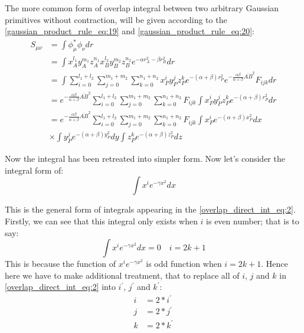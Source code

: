 The more common form of overlap integral between two arbitrary Gaussian primitives without 
contraction, will be given according to the \ref{gaussian_product_rule_eq:19} and 
\ref{gaussian_product_rule_eq:20}:
\begin{equation}
 \label{overlap_direct_int_eq:2}
\begin{split}
S_{\mu\nu}  &= \int \phi_{\mu}^{*}\phi_{\nu} dr \\
&= \int x_{A}^{l_{1}}y_{A}^{m_{1}}z_{A}^{n_{1}}
        x_{B}^{l_{2}}y_{B}^{m_{2}}z_{B}^{n_{2}}
        e^{-\alpha r_{A}^{2} - \beta r_{B}^{2}} dr \\
&= \int \sum_{i=0}^{l_{1}+l_{2}}\sum_{j=0}^{m_{1}+m_{2}}\sum_{k=0}^{n_{1}+n_{2}}
   x_{P}^{i}y_{P}^{j}z_{P}^{k}
   e^{-(\alpha+\beta)r_{P}^{2}} e^{-\frac{\alpha\beta}{\alpha+\beta}\overline{AB}^{2}}
   F_{ijk} dr \\
&= e^{-\frac{\alpha\beta}{\alpha+\beta}\overline{AB}^{2}}
   \sum_{i=0}^{l_{1}+l_{2}}\sum_{j=0}^{m_{1}+m_{2}}\sum_{k=0}^{n_{1}+n_{2}}F_{ijk}
   \int x_{P}^{i}y_{P}^{j}z_{P}^{k} e^{-(\alpha+\beta)r_{P}^{2}} dr \\
&= e^{-\frac{\alpha\beta}{\alpha+\beta}\overline{AB}^{2}}
   \sum_{i=0}^{l_{1}+l_{2}}\sum_{j=0}^{m_{1}+m_{2}}\sum_{k=0}^{n_{1}+n_{2}}F_{ijk}
   \int x_{P}^{i}e^{-(\alpha+\beta)x_{P}^{2}} dx \\
&\times
   \int y_{P}^{j}e^{-(\alpha+\beta)y_{P}^{2}} dy \int z_{P}^{k}e^{-(\alpha+\beta)z_{P}^{2}} dz  
\end{split}
\end{equation}

Now the integral has been retreated into simpler form. Now let's consider the integral form
of:
\begin{equation}
 \label{overlap_direct_int_eq:3}
 \int x^{i}e^{-\gamma x^{2}} dx
\end{equation}

This is the general form of integrals appearing in the \ref{overlap_direct_int_eq:2}. 
Firstly, we can
see that this integral only exists when $i$ is even number; that is to say:
\begin{equation}
\label{overlap_direct_int_eq:even}
 \int x^{i}e^{-\gamma x^{2}} dx = 0 \quad i = 2k+1
\end{equation}
This is because the function of $x^{i}e^{-\gamma x^{2}}$ is odd function when $i = 2k+1$. Hence 
here we have to make additional treatment, that to replace all of $i$, $j$ and $k$ in 
\ref{overlap_direct_int_eq:2} into $i^{'}$, $j^{'}$ and $k^{'}$:
\begin{equation}
 \begin{split}
  i &= 2*i^{'} \\ 
  j &= 2*j^{'} \\
  k &= 2*k^{'} 
 \end{split}
 \label{overlap_direct_int_eq:4}
\end{equation}

